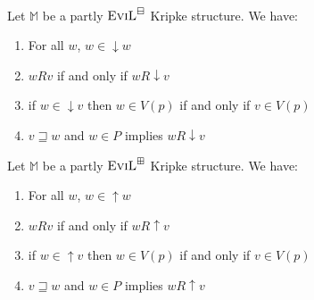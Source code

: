 \begin{lemma}\label{downset-upset-lemma}\ \\
\begin{minipage}[b]{0.5\linewidth}
Let $\mathbb{M}$ be a partly $\textsc{EviL}^\boxminus$ Kripke structure. We have:
\begin{enumerate}[label=\textup{(\emph{\arabic*})$^\BM$},
  topsep=0.075in, parsep=0.075in]
  \item For all $w$, $w \in \downarrow w$
  \item $w R v$ if and only if $w R \downarrow v$
  \item if $w \in \downarrow v$ then $w \in V(p)$ if and only if $v
    \in V(p)$
  \item $v \sqsupseteq w$ and $w \in P$ implies $w R \downarrow v$
\end{enumerate}
\end{minipage}
\hspace{0.5cm}
\begin{minipage}[b]{0.5\linewidth}
Let $\mathbb{M}$ be a partly $\textsc{EviL}^\boxplus$ Kripke structure.  We have:
\begin{enumerate}[label=\textup{(\emph{\arabic*})$^\BP$}, topsep=0.075in, parsep=0.075in]
  \item For all $w$, $w \in \uparrow w$
  \item $w R v$ if and only if $w R \uparrow v$
  \item if $w \in \uparrow v$ then $w \in V(p)$ if and only if $v
    \in V(p)$
  \item $v \sqsupseteq w$ and $w \in P$ implies $w R \uparrow v$
\end{enumerate}
\end{minipage}
\end{lemma}
